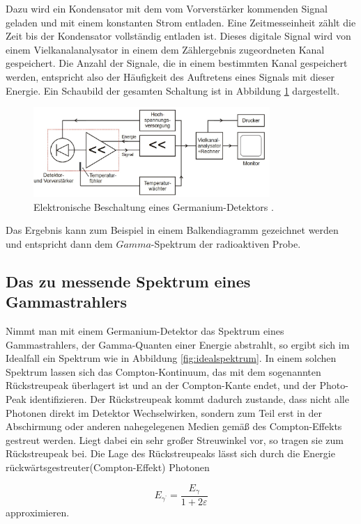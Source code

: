 Dazu wird ein Kondensator mit dem vom Vorverstärker kommenden Signal geladen und mit einem konstanten Strom entladen.
Eine Zeitmesseinheit zählt die Zeit bis der Kondensator vollständig entladen ist.
Dieses digitale Signal wird von einem Vielkanalanalysator in einem dem Zählergebnis zugeordneten Kanal gespeichert.
Die Anzahl der Signale, die in einem bestimmten Kanal gespeichert werden, entspricht also der Häufigkeit des Auftretens eines Signals mit dieser Energie.
Ein Schaubild der gesamten Schaltung ist in Abbildung \ref{fig:t:3} dargestellt.
\begin{figure}
\centering
\includegraphics[width=0.8\textwidth]{content/skizzen/aufbau4.jpg}
\caption{Elektronische Beschaltung eines Germanium-Detektors \cite{sample}.}
\label{fig:t:3}
\end{figure}
Das Ergebnis kann zum Beispiel in einem Balkendiagramm gezeichnet werden und entspricht dann dem $Gamma$-Spektrum der radioaktiven Probe.


\subsection{Das zu messende Spektrum eines Gammastrahlers}
\label{subsec:spektrum}

Nimmt man mit einem Germanium-Detektor das Spektrum eines Gammastrahlers, der Gamma-Quanten einer Energie abstrahlt,
so ergibt sich im Idealfall ein Spektrum wie in Abbildung \ref{fig:idealspektrum}. In einem solchen Spektrum lassen
sich das Compton-Kontinuum, das mit dem sogenannten Rückstreupeak überlagert ist und an der Compton-Kante endet, und der Photo-Peak identifizieren.
Der Rückstreupeak kommt dadurch zustande, dass nicht alle Photonen direkt im Detektor Wechselwirken, sondern zum Teil
erst in der Abschirmung oder anderen nahegelegenen Medien  gemäß des Compton-Effekts gestreut werden. Liegt dabei
ein sehr großer Streuwinkel vor, so tragen sie zum Rückstreupeak bei. Die Lage des Rückstreupeaks lässt sich durch
die Energie rückwärtsgestreuter(Compton-Effekt) Photonen

\begin{equation}
  \label{eqn:rstreupos}
  E_{\gamma^\text{'}} = \frac{E_{\gamma}}{1 + 2\varepsilon}
\end{equation}
approximieren.\\ \\

